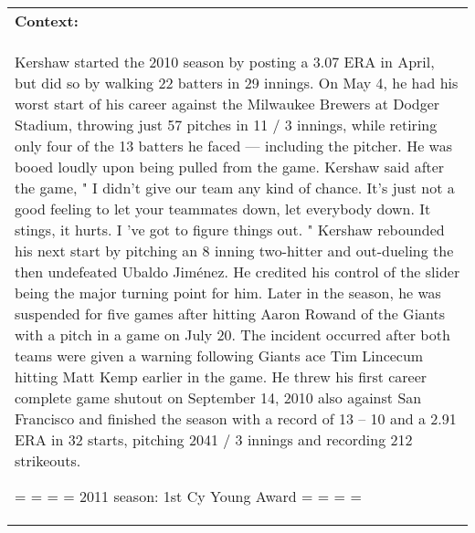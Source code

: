 \documentclass[11pt,a4paper]{article}
\begin{document}
\begin{table}[!h]
\centering
\scriptsize
\begin{tabular}{p{7.8cm}|p{7.8cm}}
	\toprule
	\multicolumn{2}{p{16cm}}{\textbf{Context:}} \\
	\multicolumn{2}{p{16cm}}{Kershaw started the 2010 season by posting a 3.07 ERA in April, but did so by walking 22 batters in 29 innings. On May 4, he had his worst start of his career against the Milwaukee Brewers at Dodger Stadium, throwing just 57 pitches in 11 / 3 innings, while retiring only four of the 13 batters he faced — including the pitcher. He was booed loudly upon being pulled from the game. Kershaw said after the game, " I didn't give our team any kind of chance. It's just not a good feeling to let your teammates down, let everybody down. It stings, it hurts. I 've got to figure things out. " 
Kershaw rebounded his next start by pitching an 8 inning two-hitter and out-dueling the then undefeated Ubaldo Jim\'{e}nez. He credited his control of the slider being the major turning point for him. Later in the season, he was suspended for five games after hitting Aaron Rowand of the Giants with a pitch in a game on July 20. The incident occurred after both teams were given a warning following Giants ace Tim Lincecum hitting Matt Kemp earlier in the game. He threw his first career complete game shutout on September 14, 2010 also against San Francisco and finished the season with a record of 13 – 10 and a 2.91 ERA in 32 starts, pitching 2041 / 3 innings and recording 212 strikeouts. 

= = = = 2011 season: 1st Cy Young Award = = = = 

}
\end{tabular}
\end{table}
\end{document}
